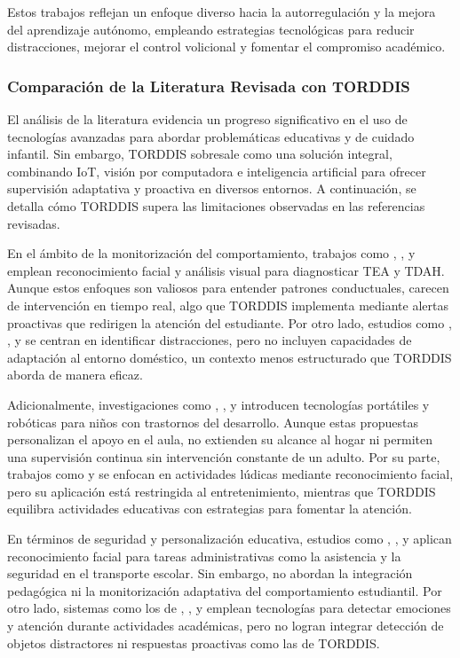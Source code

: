 \documentclass[a4paper,fleqn]{cas-sc}
\begin{document}
				Estos trabajos reflejan un enfoque diverso hacia la autorregulación y la mejora del aprendizaje autónomo, empleando estrategias tecnológicas para reducir distracciones, mejorar el control volicional y fomentar el compromiso académico.
				
			\subsubsection{Comparación de la Literatura Revisada con TORDDIS}
				El análisis de la literatura evidencia un progreso significativo en el uso de tecnologías avanzadas para abordar problemáticas educativas y de cuidado infantil. Sin embargo, TORDDIS sobresale como una solución integral, combinando IoT, visión por computadora e inteligencia artificial para ofrecer supervisión adaptativa y proactiva en diversos entornos. A continuación, se detalla cómo TORDDIS supera las limitaciones observadas en las referencias revisadas.
				
				En el ámbito de la monitorización del comportamiento, trabajos como \cite{Akter2021}, \cite{Pelc2006}, y \cite{Albrecht2014} emplean reconocimiento facial y análisis visual para diagnosticar TEA y TDAH. Aunque estos enfoques son valiosos para entender patrones conductuales, carecen de intervención en tiempo real, algo que TORDDIS implementa mediante alertas proactivas que redirigen la atención del estudiante. Por otro lado, estudios como \cite{Campbell2015Using}, \cite{Ucar2022Recognizing}, y \cite{Argel2023Intellitell} se centran en identificar distracciones, pero no incluyen capacidades de adaptación al entorno doméstico, un contexto menos estructurado que TORDDIS aborda de manera eficaz.
				
				Adicionalmente, investigaciones como \cite{Berrezueta-Guzman2021}, \cite{VilliersRader2021}, y \cite{Washington2016AWereable} introducen tecnologías portátiles y robóticas para niños con trastornos del desarrollo. Aunque estas propuestas personalizan el apoyo en el aula, no extienden su alcance al hogar ni permiten una supervisión continua sin intervención constante de un adulto. Por su parte, trabajos como \cite{Muller2018ArchnSmile} y \cite{Nguyen2019} se enfocan en actividades lúdicas mediante reconocimiento facial, pero su aplicación está restringida al entretenimiento, mientras que TORDDIS equilibra actividades educativas con estrategias para fomentar la atención.
				
				En términos de seguridad y personalización educativa, estudios como \cite{Hachad2020}, \cite{James2019}, y \cite{Boumiza2017} aplican reconocimiento facial para tareas administrativas como la asistencia y la seguridad en el transporte escolar. Sin embargo, no abordan la integración pedagógica ni la monitorización adaptativa del comportamiento estudiantil. Por otro lado, sistemas como los de \cite{DaCosta2023}, \cite{Kumar2024Zoom}, y \cite{Narkhede2023} emplean tecnologías para detectar emociones y atención durante actividades académicas, pero no logran integrar detección de objetos distractores ni respuestas proactivas como las de TORDDIS.
				
\end{document}
